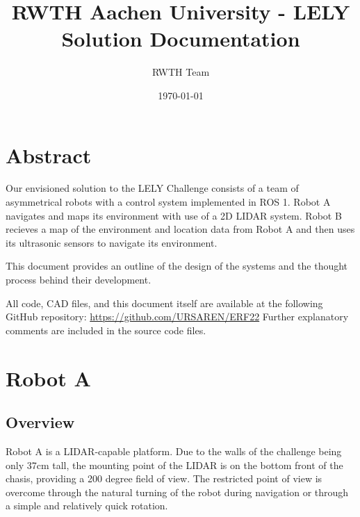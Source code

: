 \documentclass[11pt]{article}
\title{RWTH Aachen University - LELY Solution Documentation}
\author{RWTH Team}
\date{\today}
\begin{document}
	\maketitle	
	
	\section{Abstract}
	
	Our envisioned solution to the LELY Challenge consists of a team of asymmetrical robots with a control system implemented in ROS 1. Robot A navigates and maps its environment with use of a 2D LIDAR system. Robot B recieves a map of the environment and location data from Robot A and then uses its ultrasonic sensors to navigate its environment.\newline
	
	This document provides an outline of the design of the systems and the thought process behind their development. \newline
	
	All code, CAD files, and this document itself are available at the following GitHub repository: \href{https://github.com/URSAREN/ERF22}{https://github.com/URSAREN/ERF22} 
	\newline
	\newline
	Further explanatory comments are included in the source code files.
	
	\section{Robot A}
	
	\subsection{Overview}
	Robot A is a LIDAR-capable platform. Due to the walls of the challenge being only 37cm tall, the mounting point of the LIDAR is on the bottom front of the chasis, providing a 200 degree field of view. The restricted point of view is overcome through the natural turning of the robot during navigation or through a simple and relatively quick rotation.
	
\end{document}
